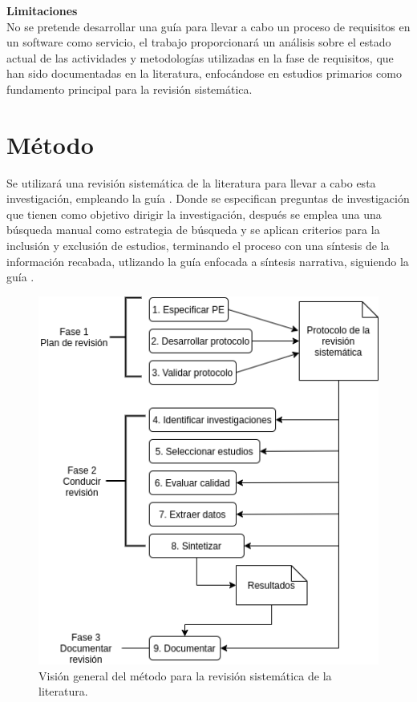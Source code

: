\documentclass{article}
\begin{document}
\textbf{Limitaciones} \\
No se pretende desarrollar una guía para llevar a cabo un proceso de requisitos en un software como servicio, el trabajo 
proporcionará un análisis sobre el estado actual de las actividades y metodologías utilizadas en la fase de requisitos, que han sido 
documentadas en la literatura, enfocándose en estudios primarios como fundamento principal para la revisión sistemática. 
\newpage

\section{Método}
Se utilizará una revisión sistemática de la literatura para llevar a cabo esta investigación, 
empleando la guía \cite{metodo}. Donde se especifican preguntas de investigación que tienen 
como objetivo dirigir la investigación, después se emplea una una búsqueda manual como estrategia de búsqueda y 
se aplican criterios para la inclusión y exclusión de estudios, terminando el proceso con una síntesis de la información 
recabada, utlizando la guía enfocada a síntesis narrativa, siguiendo la guía \cite{sintesisnarrativa}.

\begin{figure}[!htb]
   \includegraphics[width=\linewidth]{metodo.png}
   \caption{Visión general del método para la revisión sistemática de la literatura.}
   \label{fig:etapasconducción}
\end{figure}
\end{document}
